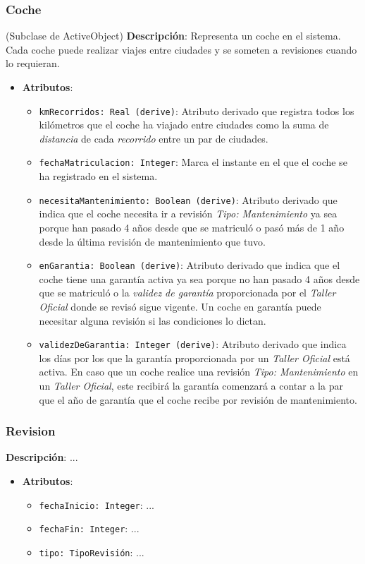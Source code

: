 \documentclass[12pt.a4paper]{article}
\begin{document}
\subsubsection{Coche} (Subclase de ActiveObject)
\textbf{Descripción}:  
Representa un coche en el sistema. Cada coche puede realizar viajes entre ciudades y se someten a revisiones cuando lo requieran.
\begin{itemize}
    \item \textbf{Atributos}:
    \begin{itemize}
        \item \texttt{kmRecorridos: Real (derive)}: Atributo derivado que registra todos los kilómetros que el coche ha viajado entre ciudades como la suma de
        \textit{distancia} de cada \textit{recorrido} entre un par de ciudades.
        \item \texttt{fechaMatriculacion: Integer}: Marca el instante en el que el coche se ha registrado en el sistema.
        \item \texttt{necesitaMantenimiento: Boolean (derive)}: Atributo derivado que indica que el coche necesita ir a revisión \textit{Tipo: Mantenimiento} ya sea porque han pasado 4 años desde que se matriculó o pasó más de 1 año desde la última revisión de mantenimiento que tuvo.
        \item \texttt{enGarantia: Boolean (derive)}: Atributo derivado que indica que el coche tiene una garantía activa ya sea porque no han pasado 4 años desde que se matriculó o la \textit{validez de garantía} proporcionada por el \textit{Taller Oficial} donde se revisó sigue vigente. Un coche en garantía puede necesitar alguna revisión si las condiciones lo dictan.
        \item \texttt{validezDeGarantia: Integer (derive)}: Atributo derivado que indica los días por los que la garantía proporcionada por un \textit{Taller Oficial} está activa. En caso que un coche realice una revisión \textit{Tipo: Mantenimiento} en un \textit{Taller Oficial}, este recibirá la garantía comenzará a contar a la par que el año de garantía que el coche recibe por revisión de mantenimiento.
    \end{itemize}
\end{itemize}

\subsubsection{Revision}
\textbf{Descripción}:  
...
\begin{itemize}
    \item \textbf{Atributos}:
    \begin{itemize}
        \item \texttt{fechaInicio: Integer}: ...
        \item \texttt{fechaFin: Integer}: ...
        \item \texttt{tipo: TipoRevisión}: ...
    \end{itemize}
\end{itemize}
\end{document}
